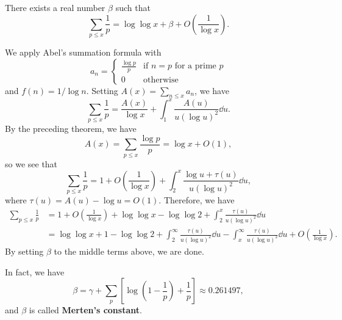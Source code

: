 \begin{thm}[Merten]
There exists a real number $\beta$ such that 
\[ \sum_{p \leq x} \frac1p = \log\log x + \beta + O\left(\frac1{\log x}\right). \]
\end{thm}
\begin{pf}
We apply Abel's summation formula with 
\[ a_n = \begin{cases} \frac{\log p}p & \text{if $n = p$ for a prime $p$} \\ 0 & \text{otherwise} \end{cases} \]
and $f(n) = 1/\log n$. Setting $A(x) = \sum_{n\leq x} a_n$, we have 
\[ \sum_{p \leq x} \frac1p = \frac{A(x)}{\log x} + 
\int_1^x \frac{A(u)}{u(\log u)^2}\dd u. \]
By the preceding theorem, we have 
\[ A(x) = \sum_{p\leq x} \frac{\log p}p = \log x + O(1), \]
so we see that 
\[ \sum_{p\leq x} \frac1p = 1 + O\left(\frac1{\log x}\right)
+ \int_2^x \frac{\log u + \tau(u)}{u(\log u)^2}\dd u, \]
where $\tau(u) = A(u) - \log u = O(1)$. Therefore, we have 
\begin{align*}
    \sum_{p\leq x} \frac1p 
    &= 1 + O\left( \frac1{\log x} \right) + \log\log x 
    - \log\log 2 + \int_2^x \frac{\tau(u)}{u(\log u)^2}\dd u \\
    &= \log\log x + 1 - \log\log 2 + \int_2^\infty 
    \frac{\tau(u)}{u(\log u)^2}\dd u - 
    \int_x^\infty \frac{\tau(u)}{u(\log u)^2}\dd u + 
    O \left( \frac1{\log x} \right). 
\end{align*}
By setting $\beta$ to the middle terms above, we are done.
\end{pf}

In fact, we have 
\[ \beta = \gamma + \sum_p \left[ \log \left( 1 - \frac1p \right) + \frac1p \right] \approx 0.261497, \]
and $\beta$ is called {\bf Merten's constant}.